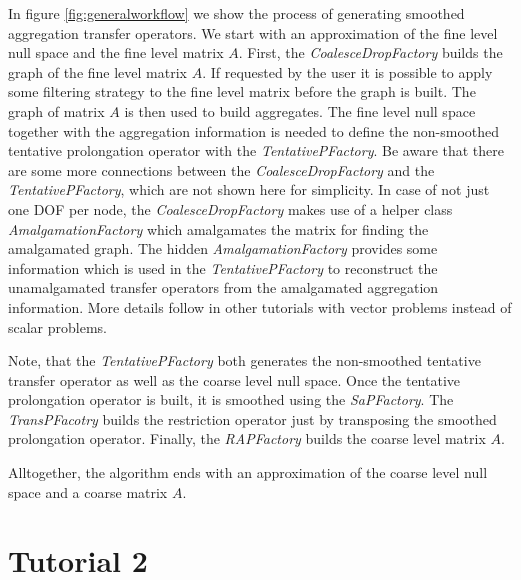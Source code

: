 \documentclass[12pt,a4paper]{article}
\begin{document}
In figure \ref{fig:generalworkflow} we show the process of generating smoothed aggregation transfer operators. We start with an approximation of the fine level null space and the fine level matrix $A$. 
First, the \textit{CoalesceDropFactory} builds the graph of the fine level matrix $A$. If requested by the user it is possible to apply some filtering strategy to the fine level matrix before the graph is built. The graph of matrix $A$ is then used to build aggregates. The fine level null space together with the aggregation information is needed to define the non-smoothed tentative prolongation operator with the \textit{TentativePFactory}. Be aware that there are some more connections between the \textit{CoalesceDropFactory} and the \textit{TentativePFactory}, which are not shown here for simplicity. In case of not just one DOF per node, the \textit{CoalesceDropFactory} makes use of a helper class \textit{AmalgamationFactory} which amalgamates the matrix for finding the amalgamated graph. The hidden \textit{AmalgamationFactory} provides some information which is used in the \textit{TentativePFactory} to reconstruct the unamalgamated transfer operators from the amalgamated aggregation information. More details follow in other tutorials with vector problems instead of scalar problems.

Note, that the \textit{TentativePFactory} both generates the non-smoothed tentative transfer operator as well as the coarse level null space. Once the tentative prolongation operator is built, it is smoothed using the \textit{SaPFactory}. The \textit{TransPFacotry} builds the restriction operator just by transposing the smoothed prolongation operator. Finally, the \textit{RAPFactory} builds the coarse level matrix $A$.

Alltogether, the algorithm ends with an approximation of the coarse level null space and a coarse matrix $A$.


\section{Tutorial 2}
\end{document}
